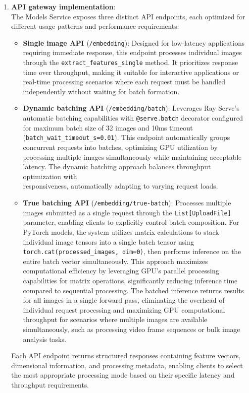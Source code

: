 \begin{enumerate}
    \item \textbf{API gateway implementation}:\\
    The Models Service exposes three distinct API endpoints, each optimized for different usage patterns and performance requirements:
    
    \begin{itemize}
        \item \textbf{Single image API} (\texttt{/embedding}): Designed for low-latency applications requiring immediate response, this endpoint processes individual images through the \texttt{extract\_features\_single} method. It prioritizes response time over throughput, making it suitable for interactive applications or real-time processing scenarios where each request must be handled\\independently without waiting for batch formation.
        
        \item \textbf{Dynamic batching API} (\texttt{/embedding/batch}): Leverages Ray Serve's automatic batching capabilities with \texttt{@serve.batch} decorator configured for maximum batch size of 32 images and 10ms timeout \\(\texttt{batch\_wait\_timeout\_s=0.01}). This endpoint automatically groups concurrent requests into batches, optimizing GPU utilization by processing multiple images simultaneously while maintaining acceptable latency. The dynamic batching approach balances throughput optimization with\\responsiveness, automatically adapting to varying request loads.
        
        \item \textbf{True batching API} (\texttt{/embedding/true-batch}): Processes multiple images submitted as a single request through the \texttt{List[UploadFile]} parameter, enabling clients to explicitly control batch composition. For PyTorch models, the system utilizes matrix calculations to stack individual image tensors into a single batch tensor using\\ \texttt{torch.cat(processed\_images, dim=0)}, then performs inference on the entire batch vector simultaneously. This approach maximizes\\ computational efficiency by leveraging GPU's parallel processing capabilities for matrix operations, significantly reducing inference time compared to sequential processing. The batched inference returns results for all images in a single forward pass, eliminating the overhead of individual request processing and maximizing GPU computational throughput for scenarios where multiple images are available simultaneously, such as processing video frame sequences or bulk image analysis tasks.
    \end{itemize}
    
    Each API endpoint returns structured responses containing feature vectors, dimensional information, and processing metadata, enabling clients to select the most appropriate processing mode based on their specific latency and throughput requirements.
\end{enumerate}

